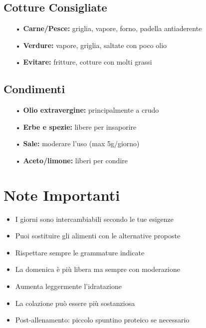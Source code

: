 \documentclass[11pt,a4paper]{article}
\begin{document}
\subsection{Cotture Consigliate}
\begin{itemize}[leftmargin=*]
\item[\textcolor{maincolor}{•}] \textbf{Carne/Pesce:} griglia, vapore, forno, padella antiaderente
\item[\textcolor{maincolor}{•}] \textbf{Verdure:} vapore, griglia, saltate con poco olio
\item[\textcolor{maincolor}{•}] \textbf{Evitare:} fritture, cotture con molti grassi
\end{itemize}

\subsection{Condimenti}
\begin{itemize}[leftmargin=*]
\item[\textcolor{maincolor}{•}] \textbf{Olio extravergine:} principalmente a crudo
\item[\textcolor{maincolor}{•}] \textbf{Erbe e spezie:} libere per insaporire
\item[\textcolor{maincolor}{•}] \textbf{Sale:} moderare l'uso (max 5g/giorno)
\item[\textcolor{maincolor}{•}] \textbf{Aceto/limone:} liberi per condire
\end{itemize}

\section{Note Importanti}

\begin{tcolorbox}[colback=lightgray,colframe=maincolor,boxrule=2pt,arc=3pt,title=\textbf{FLESSIBILITÀ DEL PIANO}]
\begin{itemize}[leftmargin=*,itemsep=5pt]
\item I giorni sono intercambiabili secondo le tue esigenze
\item Puoi sostituire gli alimenti con le alternative proposte
\item Rispettare sempre le grammature indicate
\item La domenica è più libera ma sempre con moderazione
\end{itemize}
\end{tcolorbox}

\begin{tcolorbox}[colback=lightgray,colframe=accentcolor,boxrule=1pt,arc=3pt,title=\textbf{GIORNI DI ALLENAMENTO}]
\begin{itemize}[leftmargin=*,itemsep=5pt]
\item Aumenta leggermente l'idratazione
\item La colazione può essere più sostanziosa
\item Post-allenamento: piccolo spuntino proteico se necessario
\end{itemize}
\end{tcolorbox}
\end{document}
